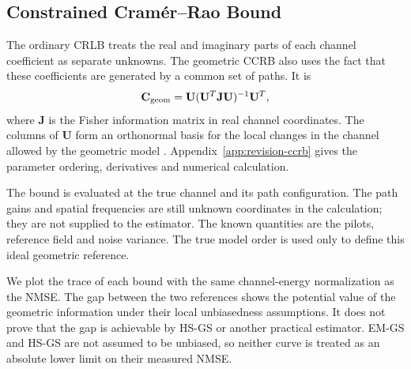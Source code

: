 \subsection{Constrained Cram\'er--Rao Bound}
\label{sec:revised-ccrb}

The ordinary CRLB treats the real and imaginary parts of each channel
coefficient as separate unknowns. The geometric CCRB also uses the fact
that these coefficients are generated by a common set of paths. It is
\begin{equation}
\mathbf C_{\rm geom}
=\mathbf U(\mathbf U^T\mathbf J\mathbf U)^{-1}\mathbf U^T,
\label{eq:revision-ccrb}
\end{equation}
where $\mathbf J$ is the Fisher information matrix in real channel
coordinates. The columns of $\mathbf U$ form an orthonormal basis for the
local changes in the channel allowed by the geometric model
\cite{gorman1990,stoica1998}. Appendix~\ref{app:revision-ccrb} gives the
parameter ordering, derivatives and numerical calculation.

The bound is evaluated at the true channel and its path configuration.
The path gains and spatial frequencies are still unknown coordinates in
the calculation; they are not supplied to the estimator. The known
quantities are the pilots, reference field and noise variance. The true
model order is used only to define this ideal geometric reference.

We plot the trace of each bound with the same channel-energy normalization
as the NMSE. The gap between the two references shows the potential value
of the geometric information under their local unbiasedness assumptions.
It does not prove that the gap is achievable by HS-GS or another practical
estimator. EM-GS and HS-GS are not assumed to be unbiased, so neither curve
is treated as an absolute lower limit on their measured NMSE.
